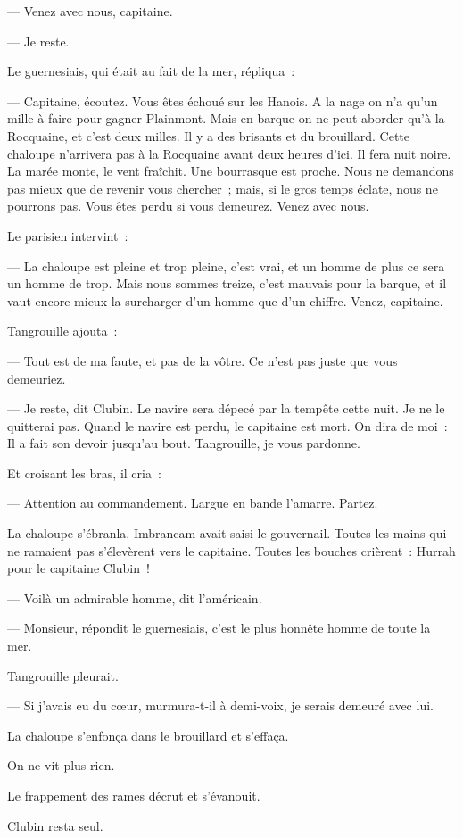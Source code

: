 \documentclass[french,twoside]{book} %
\begin{document}
— Venez avec nous, capitaine.\par
— Je reste.\par
Le guernesiais, qui était au fait de la mer, répliqua :\par
— Capitaine, écoutez. Vous êtes échoué sur les Hanois. A la nage on n’a qu’un mille à faire pour  gagner Plainmont. Mais en barque on ne peut aborder qu’à la Rocquaine, et c’est deux milles. Il y a des brisants et du brouillard. Cette chaloupe n’arrivera pas à la Rocquaine avant deux heures d’ici. Il fera nuit noire. La marée monte, le vent fraîchit. Une bourrasque est proche. Nous ne demandons pas mieux que de revenir vous chercher ; mais, si le gros temps éclate, nous ne pourrons pas. Vous êtes perdu si vous demeurez. Venez avec nous.\par
Le parisien intervint :\par
— La chaloupe est pleine et trop pleine, c’est vrai, et un homme de plus ce sera un homme de trop. Mais nous sommes treize, c’est mauvais pour la barque, et il vaut encore mieux la surcharger d’un homme que d’un chiffre. Venez, capitaine.\par
Tangrouille ajouta :\par
— Tout est de ma faute, et pas de la vôtre. Ce n’est pas juste que vous demeuriez.\par
— Je reste, dit Clubin. Le navire sera dépecé par la tempête cette nuit. Je ne le quitterai pas. Quand le navire est perdu, le capitaine est mort. On dira de moi : Il a fait son devoir jusqu’au bout. Tangrouille, je vous pardonne.\par
Et croisant les bras, il cria :\par
— Attention au commandement. Largue en bande l’amarre. Partez.\par
La chaloupe s’ébranla. Imbrancam avait saisi le gouvernail. Toutes les mains qui ne ramaient pas s’élevèrent vers le capitaine. Toutes les bouches crièrent : Hurrah pour le capitaine Clubin !\par
 — Voilà un admirable homme, dit l’américain.\par
— Monsieur, répondit le guernesiais, c’est le plus honnête homme de toute la mer.\par
Tangrouille pleurait.\par
— Si j’avais eu du cœur, murmura-t-il à demi-voix, je serais demeuré avec lui.\par
La chaloupe s’enfonça dans le brouillard et s’effaça.\par
On ne vit plus rien.\par
Le frappement des rames décrut et s’évanouit.\par
Clubin resta seul.
\end{document}
